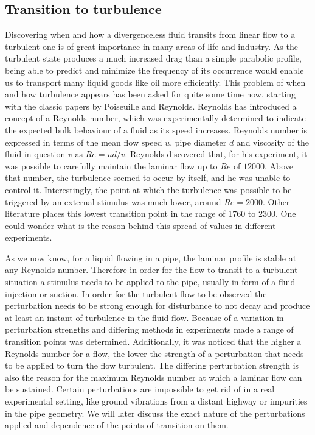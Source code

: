 \documentclass[11pt,a4paper]{article}
\begin{document}
\subsection{Transition to turbulence}
Discovering when and how a divergenceless fluid transits from linear flow to a turbulent one is of great importance in many areas of life and industry.
As the turbulent state produces a much increased drag than a simple parabolic profile, being able to predict and minimize the frequency of its occurrence would enable us to transport many liquid goods like oil more efficiently.
This problem of when and how turbulence appears has been asked for quite some time now, starting with the classic papers by Poiseuille\cite{Poiseuille40} and Reynolds\cite{Reynolds83}.
Reynolds has introduced a concept of a Reynolds number, which was experimentally determined to indicate the expected bulk behaviour of a fluid as its speed increases.
Reynolds number is expressed in terms of the mean flow speed \(u\), pipe diameter \(d\) and viscosity of the fluid in question \(v\) as \(Re = ud/v\).
Reynolds discovered that, for his experiment, it was possible to carefully maintain the laminar flow up to \(Re\) of \(12000\).
Above that number, the turbulence seemed to occur by itself, and he was unable to control it.
Interestingly, the point at which the turbulence was possible to be triggered by an external stimulus was much lower, around \(Re = 2000\).
Other literature places this lowest transition point in the range of 1760 to 2300\cite{Kerswell05}.
One could wonder what is the reason behind this spread of values in different experiments.

As we now know, for a liquid flowing in a pipe, the laminar profile is stable at any Reynolds number\cite{Eckhardt07}.
Therefore in order for the flow to transit to a turbulent situation a stimulus needs to be applied to the pipe, usually in form of a fluid injection or suction\cite{Darbyshire95}.
In order for the turbulent flow to be observed the perturbation needs to be strong enough for disturbance to not decay and produce at least an instant of turbulence in the fluid flow\cite{Salwen80}\cite{Meseguer03}.
Because of a variation in perturbation strengths and differing methods in experiments made a range of transition points was determined.
Additionally, it was noticed that the higher a Reynolds number for a flow, the lower the strength of a perturbation that needs to be applied to turn the flow turbulent\cite{Hof03}.
The differing perturbation strength is also the reason for the maximum Reynolds number at which a laminar flow can be sustained.
Certain perturbations are impossible to get rid of in a real experimental setting, like ground vibrations from a distant highway or impurities in the pipe geometry.
We will later discuss the exact nature of the perturbations applied and dependence of the points of transition on them.
\end{document}
